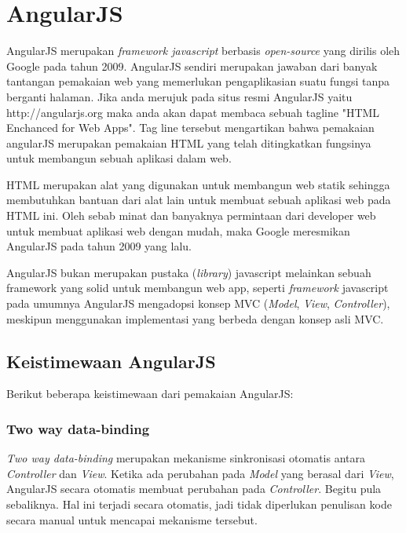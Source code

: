 \section{AngularJS}
\label{sec: angularJS}
	
	AngularJS merupakan \textit{framework javascript} berbasis \textit{open-source} yang dirilis oleh Google pada tahun 2009. AngularJS sendiri merupakan jawaban dari banyak tantangan pemakaian web yang memerlukan pengaplikasian suatu fungsi tanpa berganti halaman. Jika anda merujuk pada situs resmi AngularJS yaitu http://angularjs.org maka anda akan dapat membaca sebuah tagline "HTML Enchanced for Web Apps". Tag line tersebut mengartikan bahwa pemakaian angularJS merupakan pemakaian HTML yang telah ditingkatkan fungsinya untuk membangun sebuah aplikasi dalam web.
	
	HTML merupakan alat yang digunakan untuk membangun web statik sehingga membutuhkan bantuan dari alat lain untuk membuat sebuah aplikasi web pada HTML ini. Oleh sebab minat dan banyaknya permintaan dari developer web untuk membuat aplikasi web dengan mudah, maka Google meresmikan AngularJS pada tahun 2009 yang lalu.
	
	AngularJS bukan merupakan pustaka (\textit{library}) javascript melainkan sebuah framework yang solid untuk membangun web app, seperti \textit{framework} javascript pada umumnya AngularJS mengadopsi konsep MVC (\textit{Model}, \textit{View}, \textit{Controller}), meskipun menggunakan implementasi yang berbeda dengan konsep asli MVC.
	
\subsection{Keistimewaan AngularJS}
\label{sub: keistimewaanAngularJS}
	Berikut beberapa keistimewaan dari pemakaian AngularJS:
	
\subsubsection{Two way data-binding}
\label{sub: twoWayDataBinding}

	\textit{Two way data-binding} merupakan mekanisme sinkronisasi otomatis antara \textit{Controller} dan \textit{View}. Ketika ada perubahan pada \textit{Model} yang berasal dari \textit{View}, AngularJS secara otomatis membuat perubahan pada \textit{Controller}. Begitu pula sebaliknya. Hal ini terjadi secara otomatis, jadi tidak diperlukan penulisan kode secara manual untuk mencapai mekanisme tersebut.

